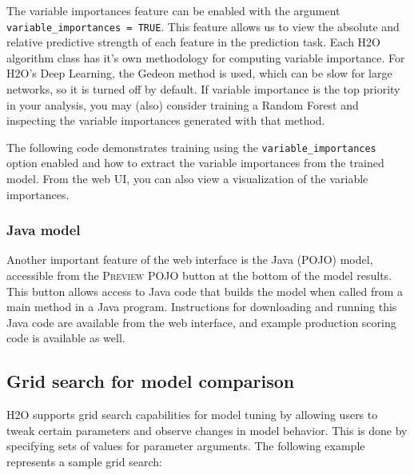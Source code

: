 The variable importances feature can be enabled with the argument \texttt{variable\_importances = TRUE}. This feature allows us to view the absolute and relative predictive strength of each feature in the prediction task.  Each H2O algorithm class has it's own methodology for computing variable importance.  For H2O's Deep Learning, the Gedeon method is used, which can be slow for large networks, so it is turned off by default.  If variable importance is the top priority in your analysis, you may (also) consider training a Random Forest and inspecting the variable importances generated with that method.

The following code demonstrates training using the \texttt{variable\_importances} option enabled and how to extract the variable importances from the trained model.  From the web UI, you can also view a visualization of the variable importances.

\waterExampleInR


\waterExampleInPython




\subsubsection{Java model} 

Another important feature of the web interface is the Java (POJO) model, accessible from the \textsc{Preview POJO} button at the bottom of the model results. This button allows access to Java code that builds the model when called from a main method in a Java program. Instructions for downloading and running this Java code are available from the web interface, and example production scoring code is available as well.

\subsection{Grid search for model comparison} 

H2O supports grid search capabilities for model tuning by allowing users to tweak certain parameters and observe changes in model behavior. This is done by specifying sets of values for parameter arguments. The following example represents a sample grid search:

%
%

